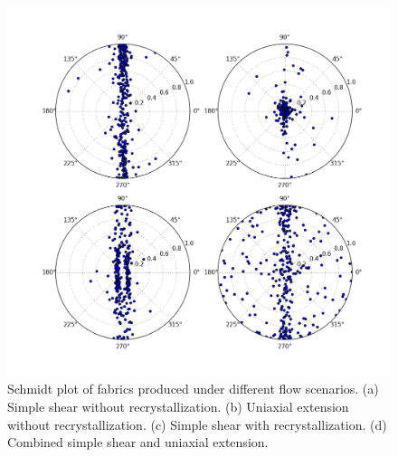 \documentclass{igs}
\begin{document}
\begin{figure}
\caption{Schmidt plot of fabrics produced under different flow scenarios. (a) Simple shear without recrystallization. (b) Uniaxial extension without recrystallization. (c) Simple shear with recrystallization. (d) Combined simple shear and uniaxial extension.} 
\includegraphics[width=12cm]{all4}
\end{figure}
\end{document}
